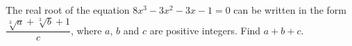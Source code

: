 The real root of the equation $8x^3-3x^2-3x-1=0$ can be written in the form $\dfrac{\sqrt[3]{a}+\sqrt[3]{b}+1}{c}$, where $a$, $b$ and $c$ are positive integers. Find $a+b+c$.
